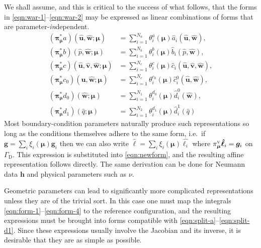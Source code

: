 \documentclass[onecolumn, twoside, a4paper, 11pt]{article}
\begin{document}
We shall assume, and this is critical to the success of what follows, that the
forms in \eqref{eqn:war-1}--\eqref{eqn:war-2} may be expressed as linear
combinations of forms that are parameter-\emph{in}dependent.
\begin{align}
  (\bm\pi_{\bm\mu}^* a)(
    \hat{\bm u},
    \hat{\bm w};
    \bm \mu
  ) &= \sum_{i=1}^{N_a} \theta^a_i(\bm \mu) \hat{a}_i(\hat{\bm u}, \hat{\bm w}), \label{eqn:split-a} \\
    (\bm\pi_{\bm\mu}^* b)(
    \hat{p},
     \hat{\bm w};
    \bm \mu
  ) &= \sum_{i=1}^{N_b} \theta^b_i(\bm \mu) \hat{b}_i(\hat{p}, \hat{\bm w}), \label{eqn:split-b} \\
  (\bm\pi_{\bm\mu}^* c)(
    \hat{\bm u},
    \hat{\bm v},
    \hat{\bm w};
    \bm \mu
  ) &= \sum_{i=1}^{N_c} \theta^c_i(\bm \mu)
      \hat{c}_i(\hat{\bm u}, \hat{\bm v}, \hat{\bm w}), \label{eqn:split-c} \\
  (\bm\pi_{\bm\mu}^* c_0)(
    \hat{\bm u},
    \hat{\bm w};
    \bm \mu
  ) &= \sum_{i=1}^{N_c} \theta^{c_0}_i(\bm \mu)
      \hat{c}{}^{0}_i(\hat{\bm u}, \hat{\bm w}), \label{eqn:split-c0} \\
  (\bm\pi_{\bm\mu}^* d_0)(
    \hat{\bm w};
    \bm \mu
  ) &= \sum_{i=1}^{N_1} \theta^{d_0}_i(\bm \mu) \hat{d}^0_i(\hat{\bm w}), \label{eqn:split-d0} \\
  (\bm\pi_{\bm\mu}^* d_1)(
    \hat{q};
    \bm \mu
  ) &= \sum_{i=1}^{N_2} \theta^{d_1}_i(\bm \mu) \hat{d}^1_i(\hat{q}) \label{eqn:split-d1}
\end{align}
%
Most boundary-condition parameters naturally produce such representations so
long as the conditions themselves adhere to the same form, i.e.~if
$\bm g = \sum_i \xi_i(\bm \mu) \bm g_i$ then we can also write
$\hat{\bm \ell} = \sum_i \xi_i(\bm \mu) \hat{\bm \ell_i}$ where
$\pi_{\bm\mu}^\textsc{v} \bm \hat{\bm{\ell}}_i = \bm{g}_i$ on
$\Gamma_\text{D}$. This expression is substituted into
\eqref{eqn:newform}, and the resulting affine
representation follows directly. The same derivation can be done for Neumann
data $\bm h$ and physical parameters such as $\nu$.

Geometric parameters can lead to significantly more complicated representations
unless they are of the trivial sort. In this case one must map the integrals
\eqref{eqn:form-1}--\eqref{eqn:form-4} to the reference configuration, and the
resulting expressions must be brought into forms compatible with
\eqref{eqn:split-a}--\eqref{eqn:split-d1}. Since these expressions usually
involve the Jacobian and its inverse, it is desirable that they are as simple as
possible.
\end{document}
